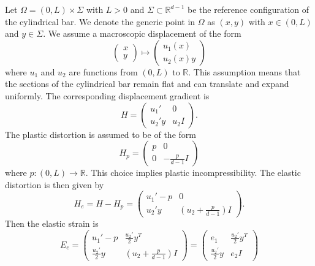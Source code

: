 \documentclass[letterpaper,oneside]{amsart}
\numberwithin{equation}{section}
\theoremstyle{definition}
\begin{document}
Let $\Omega=(0,L)\times\Sigma$ with $L>0$ and $\Sigma\subset\mathbb{R}^{d-1}$ be the reference configuration of the cylindrical bar. We denote the generic point in $\Omega$ as $(x,y)$ with $x\in(0,L)$ and $y\in\Sigma$. We assume a macroscopic displacement of the form
\begin{equation*}
\begin{pmatrix}
x \\
y
\end{pmatrix}
\mapsto
\begin{pmatrix}
u_1(x) \\
u_2(x)y
\end{pmatrix}
\end{equation*}
where $u_1$ and $u_2$ are functions from $(0,L)$ to $\mathbb{R}$. This assumption means that the sections of the cylindrical bar remain flat and can translate and expand uniformly. The corresponding displacement gradient is
\begin{equation*}
H=\begin{pmatrix}
u_1' & 0 \\
u_2'y & u_2I
\end{pmatrix}.
\end{equation*}
The plastic distortion is assumed to be of the form
\begin{equation*}
H_p=
\begin{pmatrix}
p & 0 \\
0 & -\frac{p}{d-1}I
\end{pmatrix}
\end{equation*}
where $p\colon(0,L)\to\mathbb{R}$. This choice implies plastic incompressibility. The elastic distortion is then given by
\begin{equation*}
H_e=H-H_p=\begin{pmatrix}
u_1'-p & 0 \\
u_2'y & \left(u_2+\frac{p}{d-1}\right)I
\end{pmatrix}.
\end{equation*}
Then the elastic strain is
\begin{equation*}
E_e=\begin{pmatrix}
u_1'-p & \frac{u_2'}{2}y^T \\
\frac{u_2'}{2}y & \left(u_2+\frac{p}{d-1}\right)I
\end{pmatrix}=
\begin{pmatrix}
e_1 & \frac{u_2'}{2}y^T \\
\frac{u_2'}{2}y & e_2I
\end{pmatrix}
\end{equation*}
\end{document}
